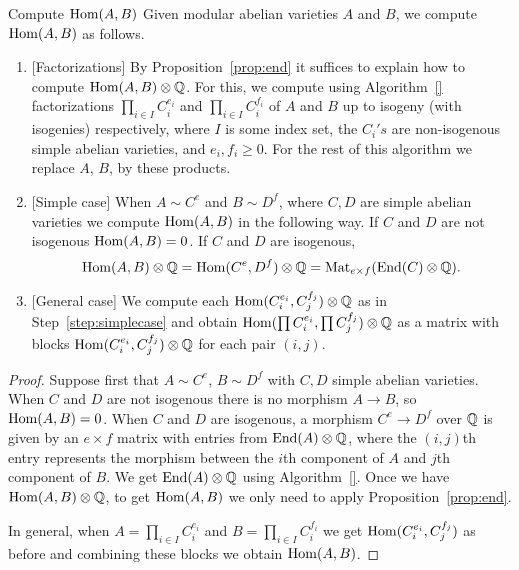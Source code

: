 \documentclass{article}
\begin{document}
\begin{algorithm}{Compute $\operatorname{Hom}(A,B)$}
    \label{alg:hom_AB}
    Given  modular abelian varieties $A$ and $B$, we
    compute $\operatorname{Hom}(A,B)$ as follows.
    \begin{enumerate}
        \item{} [Factorizations]
            By Proposition~\ref{prop:end} it suffices to explain how
            to compute $\operatorname{Hom}(A,B)\otimes \mathbb{Q}$.
            For this, we compute using Algorithm~\ref{}
            factorizations $\prod_{i \in I} C_i^{e_i}$ and $\prod_{i \in I}
            C_i^{f_i}$ of $A$ and $B$ up to isogeny (with isogenies)
            respectively, where $I$ is some index set,
            the $C_i's$ are non-isogenous simple abelian varieties, and $e_i,
            f_i \geq 0$.  For the rest of this algorithm
            we replace $A$, $B$, by these products.
        \item{} [Simple case]\label{step:simplecase} When $A \sim C^e$ and $B \sim D^f$, where $C, D$ are simple
            abelian varieties we compute $\operatorname{Hom}(A,B)$ in the following way. If $C$ and
            $D$ are not isogenous $\operatorname{Hom}(A,B) = 0$. If $C$ and $D$ are isogenous,
            $$
            \operatorname{Hom}(A,B)\otimes\mathbb{Q} = \operatorname{Hom}(C^e, D^f) \otimes \mathbb{Q} = \operatorname{Mat}_{e \times f} (\operatorname{End}(C) \otimes \mathbb{Q}).
            $$
        \item{} [General case] We compute each $\operatorname{Hom}(C_i^{e_i}, C_j^{f_j})\otimes\mathbb{Q}$ as in Step~\ref{step:simplecase}
            and obtain $\operatorname{Hom}(\prod C_i^{e_i}, \prod C_j^{f_j})\otimes\mathbb{Q}$ as a
            matrix with blocks $\operatorname{Hom}(C_i^{e_i},C_j^{f_j})\otimes\mathbb{Q}$ for each pair $(i,j)$.
    \end{enumerate}
\end{algorithm}
\begin{proof}
    Suppose first that $A \sim C^e$, $B \sim D^f$ with $C,D$ simple abelian varieties.
    When $C$ and $D$ are not isogenous there is no morphism $A \to B$, so
    $\operatorname{Hom}(A,B) =  0$. When $C$ and $D$ are isogenous, a morphism $C^e \to D^f$
    over $\mathbb{Q}$ is given by an $e \times f$ matrix with entries from $\operatorname{End}(A) \otimes
    \mathbb{Q}$, where the $(i,j)$th entry represents the morphism between the $i$th
    component of $A$ and $j$th component of $B$. We get $\operatorname{End}(A) \otimes \mathbb{Q}$
    using Algorithm~\ref{}. Once we have $\operatorname{Hom}(A,B)
    \otimes \mathbb{Q}$, to get $\operatorname{Hom}(A,B)$ we only need to apply Proposition~\ref{prop:end}.

    In general, when $A = \prod_{i \in I} C_i^{e_i}$ and $B = \prod_{i \in I}
    C_i^{f_i}$ we get $\operatorname{Hom}(C_i^{e_i}, C_j^{f_j})$ as before and combining these
    blocks we obtain $\operatorname{Hom}(A,B)$.
\end{proof}
\end{document}
